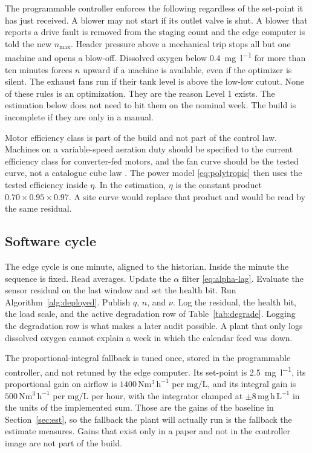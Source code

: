 The programmable controller enforces the following regardless of the set-point it has just received. A blower may not start if its outlet valve is shut. A blower that reports a drive fault is removed from the staging count and the edge computer is told the new $n_{\max}$. Header pressure above a mechanical trip stops all but one machine and opens a blow-off. Dissolved oxygen below \SI{0.4}{\milli\gram\per\litre} for more than ten minutes forces $n$ upward if a machine is available, even if the optimizer is silent. The exhaust fans run if their tank level is above the low-low cutout. None of these rules is an optimization. They are the reason Level 1 exists. The estimation below does not need to hit them on the nominal week. The build is incomplete if they are only in a manual.

Motor efficiency class is part of the build and not part of the control law. Machines on a variable-speed aeration duty should be specified to the current efficiency class for converter-fed motors, and the fan curve should be the tested curve, not a catalogue cube law \cite{iec60034,amca210,dixon2014turbo}. The power model \eqref{eq:polytropic} then uses the tested efficiency inside $\eta$. In the estimation, $\eta$ is the constant product $0.70\times 0.95\times 0.97$. A site curve would replace that product and would be read by the same residual.

\subsection{Software cycle}

The edge cycle is one minute, aligned to the historian. Inside the minute the sequence is fixed. Read averages. Update the $\alpha$ filter \eqref{eq:alpha-lag}. Evaluate the sensor residual on the last window and set the health bit. Run Algorithm~\ref{alg:deployed}. Publish $q$, $n$, and $\nu$. Log the residual, the health bit, the load scale, and the active degradation row of Table~\ref{tab:degrade}. Logging the degradation row is what makes a later audit possible. A plant that only logs dissolved oxygen cannot explain a week in which the calendar feed was down.

The proportional-integral fallback is tuned once, stored in the programmable controller, and not retuned by the edge computer. Its set-point is \SI{2.5}{\milli\gram\per\litre}, its proportional gain on airflow is $1400\,\mathrm{Nm^{3}\,h^{-1}}$ per $\mathrm{mg/L}$, and its integral gain is $500\,\mathrm{Nm^{3}\,h^{-1}}$ per $\mathrm{mg/L}$ per hour, with the integrator clamped at $\pm 8\,\mathrm{mg\,h\,L^{-1}}$ in the units of the implemented sum. Those are the gains of the baseline in Section~\ref{sec:est}, so the fallback the plant will actually run is the fallback the estimate measures. Gains that exist only in a paper and not in the controller image are not part of the build.

